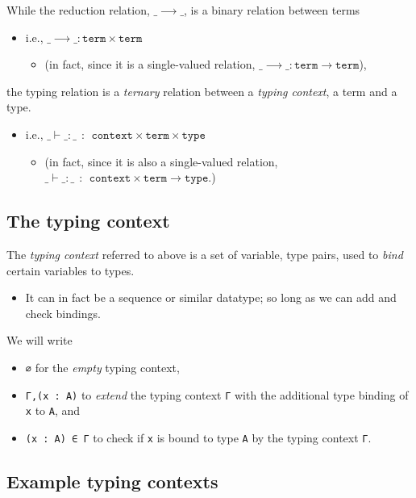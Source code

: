 \documentclass[11pt]{article}
\theoremstyle{definition}
\begin{document}
While the reduction relation, \(\_⟶\_\), is a binary relation between terms
\begin{itemize}
\item i.e., \(\_⟶\_ : \texttt{term} × \texttt{term}\)
\begin{itemize}
\item (in fact, since it is a single-valued relation, \(\_⟶\_ : \texttt{term} → \texttt{term}\)),
\end{itemize}
\end{itemize}
the typing relation is a \emph{ternary} relation between a \emph{typing context},
a term and a type.
\begin{itemize}
\item i.e., \(\_⊢\_:\_ \ \ : \ \ \texttt{context} × \texttt{term} × \texttt{type}\)
\begin{itemize}
\item (in fact, since it is also a single-valued relation,
\(\_⊢\_:\_ \ \ : \ \ \texttt{context} × \texttt{term} → \texttt{type}\).)
\end{itemize}
\end{itemize}

\subsection{The typing context}
\label{sec:org1dbeaac}

The \emph{typing context} referred to above is a set
of variable, type pairs, used to \emph{bind} certain variables to types.
\begin{itemize}
\item It can in fact be a sequence or similar datatype;
so long as we can add and check bindings.
\end{itemize}

We will write
\begin{itemize}
\item \texttt{∅} for the \emph{empty} typing context,
\item \texttt{Γ,(x : A)} to \emph{extend} the typing context \texttt{Γ} with the additional
type binding of \texttt{x} to \texttt{A}, and
\item \texttt{(x : A) ∈ Γ} to check if \texttt{x} is bound to type \texttt{A} by the typing context \texttt{Γ}.
\end{itemize}

\subsection{Example typing contexts}
\label{sec:orgc9eb34f}
\end{document}
